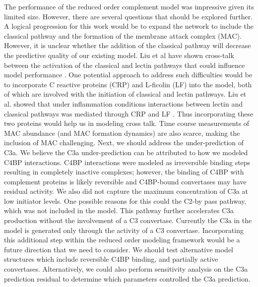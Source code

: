 \documentclass[12pt]{article}
\begin{document}
The performance of the reduced order complement model was impressive given its limited size.
However, there are several questions that should be explored further.
A logical progression for this work would be to expand the network to include the classical pathway and the formation of the membrane attack complex (MAC).
However, it is unclear whether the addition of the classical pathway will decrease the predictive quality of our existing model.
Liu et al have shown cross-talk between the activation of the classical and lectin pathways that could influence model performance \cite{liu2011computational}.
One potential approach to address such difficulties would be to incorporate C reactive proteins (CRP) and L-ficolin (LF) into the model,
both of which are involved with the initiation of classical and lectin pathways. Liu et al. showed that under inflammation conditions interactions between lectin and classical pathways was mediated through CRP and LF  \cite{liu2011computational}. Thus incorporating these two proteins would help us in modeling cross talk.
Time course measurements of MAC abundance (and MAC formation dynamics) are also scarce, making the inclusion of MAC challenging.
Next, we should address the under-prediction of C3a. We believe the C3a under-prediction can be attributed to how we modeled C4BP interactions.
C4BP interactions were modeled as irreversible binding steps resulting in completely inactive complexes;
however, the binding of C4BP with complement proteins is likely reversible and C4BP-bound convertases may have residual activity.
We also did not capture the maximum concentration of C3a at low initiator levels.
One possible reasons for this could the C2-by pass pathway, which was not included in the model.
This pathway further accelerates C3a production without the involvement of a C3 convertase.
Currently the C3a in the model is generated only through the activity of a C3 convertase.
Incorporating this additional step within the reduced order modeling framework would be a future direction that we need to consider.
We should test alternative model structures which include reversible C4BP binding, and partially active convertases.
Alternatively, we could also perform sensitivity analysis on the C3a prediction residual to determine which parameters controlled the C3a prediction.

\end{document}
